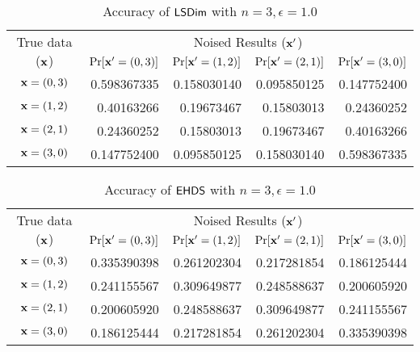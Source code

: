 \documentclass{article}
\begin{document}
\begin{table}[htbp]
	\footnotesize
	\centering
	\caption{Accuracy of $\mathsf{LSDim}$ with $n = 3, \epsilon = 1.0$}
	\label{tab_n3eps1prob_lap}
\begin{tabular}{|c||r|r|r|r|}
	\hline
	\multirow{2}{*}{True data ($\textbf{x}$)}
								& \multicolumn{4}{c|}{Noised Results ($\textbf{x}'$)}  
								\\ \cline{2-5}
	                      		&  $\Pr[\textbf{x}' = (0, 3)]$  	
	                      		&  $\Pr[\textbf{x}' = (1, 2)]$ 	
	                      		&  $\Pr[\textbf{x}' = (2, 1)]$ 	
	                      		&  $\Pr[\textbf{x}' = (3, 0)]$ 	
	                      		\\  \hline
	                      		\hline
	$\textbf{x} = (0,3)$          & 0.598367335
								& 0.158030140	
								& 0.095850125
								& 0.147752400
								\\  \hline
	$\textbf{x} = (1,2)$          & 0.40163266
								& 0.19673467
								& 0.15803013
								& 0.24360252
								\\  \hline
	$\textbf{x} = (2,1)$          & 0.24360252
								& 0.15803013
								& 0.19673467
								& 0.40163266
								\\  \hline
	$\textbf{x} = (3,0)$          & 0.147752400
								& 0.095850125	
								& 0.158030140
								& 0.598367335
								\\  \hline
\end{tabular}
\end{table}

\begin{table}[htbp]
	\footnotesize
	\centering
	\caption{Accuracy of $\mathsf{EHDS}$ with $n = 3, \epsilon = 1.0$}
	\label{tab_n3eps1prob_exp}
\begin{tabular}{|c||r|r|r|r|}
	\hline
	\multirow{2}{*}{True data ($\textbf{x}$)}
								& \multicolumn{4}{c|}{Noised Results ($\textbf{x}'$)}  
								\\ \cline{2-5}
	                      		&  $\Pr[\textbf{x}' = (0, 3)]$  	
	                      		&  $\Pr[\textbf{x}' = (1, 2)]$ 	
	                      		&  $\Pr[\textbf{x}' = (2, 1)]$ 	
	                      		&  $\Pr[\textbf{x}' = (3, 0)]$ 	
	                      		\\  \hline
	                      		\hline
	$\textbf{x} = (0,3)$          & 0.335390398
								& 0.261202304
								& 0.217281854
								& 0.186125444
								\\  \hline
	$\textbf{x} = (1,2)$          & 0.241155567
								& 0.309649877
								& 0.248588637
								& 0.200605920
								\\  \hline
	$\textbf{x} = (2,1)$          & 0.200605920
								& 0.248588637
								& 0.309649877
								& 0.241155567
								\\  \hline
	$\textbf{x} = (3,0)$          & 0.186125444
								& 0.217281854
								& 0.261202304
								& 0.335390398
								\\  \hline
\end{tabular}
\end{table}
\end{document}
